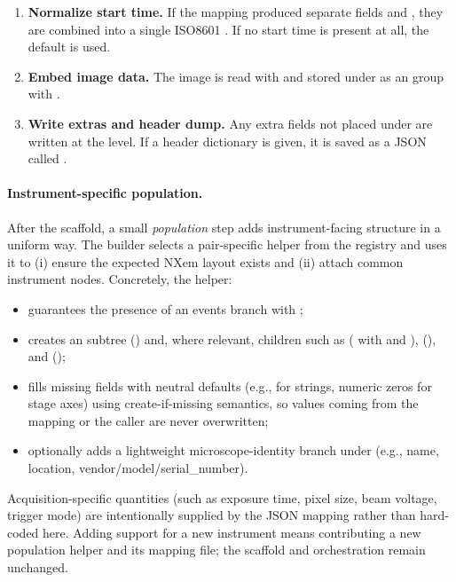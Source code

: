 \begin{enumerate}
	\item \textbf{Normalize start time.} If the mapping produced separate fields  and , 
	they are combined into a single ISO8601 . 
	If no start time is present at all, the default  is used.
	
	\item \textbf{Embed image data.} The image is read with  
	and stored under  as an  group with .
	
	\item \textbf{Write extras and header dump.} Any extra fields not placed under  are written at the  level. 
	If a header dictionary is given, it is saved as a JSON  called .
\end{enumerate}

\paragraph{Instrument-specific population.}
After the scaffold, a small \emph{population} step adds instrument-facing structure in a uniform way. The builder selects a pair-specific helper from the registry and uses it to (i) ensure the expected NXem layout exists and (ii) attach common instrument nodes. Concretely, the helper:
\begin{itemize}
	\item guarantees the presence of an events branch  with ;
	\item creates an  subtree () and, where relevant, children such as  ( with   and  ),  (), and  ();
	\item fills missing fields with neutral defaults (e.g.,  for strings, numeric zeros for stage axes) using create-if-missing semantics, so values coming from the mapping or the caller are never overwritten;
	\item optionally adds a lightweight microscope-identity branch under  (e.g., name, location, vendor/model/serial\_number).
\end{itemize}
Acquisition-specific quantities (such as exposure time, pixel size, beam voltage, trigger mode) are intentionally supplied by the JSON mapping rather than hard-coded here. Adding support for a new instrument means contributing a new population helper and its mapping file; the scaffold and orchestration remain unchanged.

